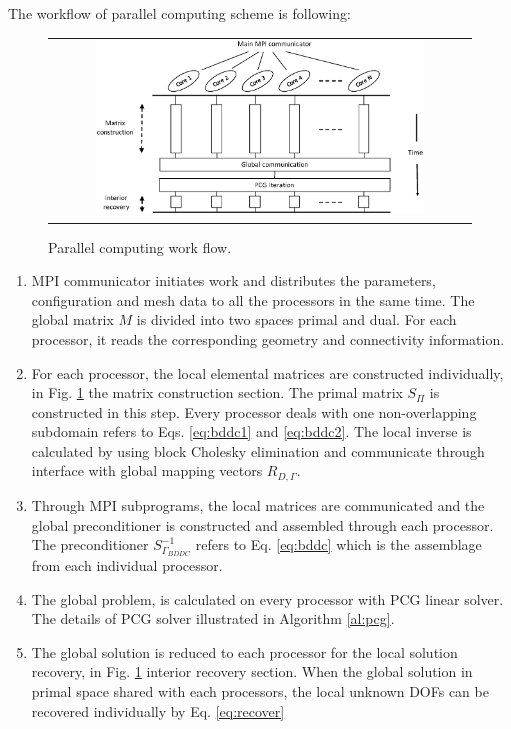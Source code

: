 The workflow of parallel computing scheme is following:
\begin{figure}[ht]
	\centering
	\begin{tabular}{c}
		\includegraphics[width=0.8\textwidth]{./pics/mpi_flow.eps}
	\end{tabular}
	\caption{\footnotesize Parallel computing work flow.}\label{fig6: mpi}
\end{figure}
\begin{enumerate}
	\item	MPI communicator initiates work and distributes the parameters, configuration and mesh data to all the processors in the same time. The global matrix $ M $ is divided into two spaces primal and dual. For each processor, it reads the corresponding geometry and connectivity information. 
	\item	For each processor, the local elemental matrices are constructed individually, in Fig. \ref{fig6: mpi} the matrix construction section. The primal matrix $ S_{\Pi} $ is constructed in this step. Every processor deals with one non-overlapping subdomain refers to Eqs. \eqref{eq:bddc1} and \eqref{eq:bddc2}. The local inverse is calculated by using block Cholesky elimination and communicate through interface with global mapping vectors $ R_{D, \Gamma} $.
	\item	Through MPI subprograms, the local matrices are communicated and the global preconditioner is constructed and assembled through each processor. The preconditioner $ S_{\Gamma_{BDDC}}^{-1} $ refers to Eq. \eqref{eq:bddc} which is the assemblage from each individual processor.
	\item	The global problem, is calculated on every processor with PCG linear solver. The details of PCG solver illustrated in Algorithm \ref{al:pcg}.
	\item	The global solution is reduced to each processor for the local solution recovery, in Fig. \ref{fig6: mpi} interior recovery section. When the global solution in primal space shared with each processors, the local unknown DOFs can be recovered individually by Eq. \eqref{eq:recover}
\end{enumerate}

